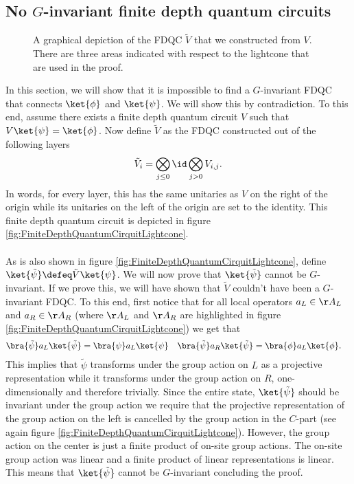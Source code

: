 \subsection{No \texorpdfstring{$G$}{G}-invariant finite depth quantum circuits}
\begin{figure}
	\centering
	\scalebox{0.65}{
		
	}
	\caption{A graphical depiction of the FDQC $\tilde{V}$ that we constructed from $V$. There are three areas indicated with respect to the lightcone that are used in the proof.}	\label{fig:ConnectingPsiAndPsi0Proof2_WithLightcone}
\end{figure}
In this section, we will show that it is impossible to find a $G$-invariant FDQC that connects $\ket{\phi}$ and $\ket{\psi}$. We will show this by contradiction. To this end, assume there exists a finite depth quantum circuit $V$ such that $V\ket{\psi}=\ket{\phi}$. Now define $\tilde{V}$ as the FDQC constructed out of the following layers
\begin{equation}
\tilde{V}_i=\bigotimes_{j\leq 0}\id \bigotimes_{j> 0}V_{i,j}.
\end{equation}
In words, for every layer, this has the same unitaries as $V$ on the right of the origin while its unitaries on the left of the origin are set to the identity. This finite depth quantum circuit is depicted in figure \ref{fig:FiniteDepthQuantumCirquitLightcone}.\\\\
As is also shown in figure \ref{fig:FiniteDepthQuantumCirquitLightcone}, define $\ket{\tilde{\psi}}\defeq \tilde{V}\ket{\psi}$. We will now prove that $\ket{\tilde{\psi}}$ cannot be $G$-invariant. If we prove this, we will have shown that $\tilde{V}$ couldn't have been a $G$-invariant FDQC. To this end, first notice that for all local operators $a_L\in\AA_L$ and $a_R\in\AA_R$ (where $\AA_L$ and $\AA_R$ are highlighted in figure \ref{fig:FiniteDepthQuantumCirquitLightcone}) we get that
\begin{align}
\bra{\tilde{\psi}}a_L\ket{\tilde{\psi}}&=\bra{\psi}a_L\ket{\psi}&\bra{\tilde{\psi}}a_R\ket{\tilde{\psi}}&=\bra{\phi}a_L\ket{\phi}.
\end{align}
This implies that $\tilde{\psi}$ transforms under the group action on $L$ as a projective representation while it transforms under the group action on $R$, one-dimensionally and therefore trivially. Since the entire state, $\ket{\tilde{\psi}}$ should be invariant under the group action we require that the projective representation of the group action on the left is cancelled by the group action in the $C$-part (see again figure \ref{fig:FiniteDepthQuantumCirquitLightcone}). However, the group action on the center is just a finite product of on-site group actions. The on-site group action was linear and a finite product of linear representations is linear. This means that $\ket{\tilde{\psi}}$ cannot be $G$-invariant concluding the proof.
